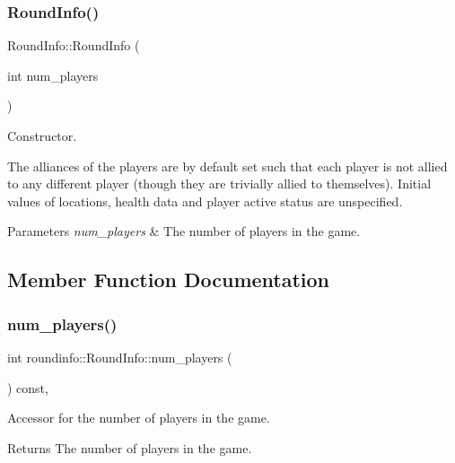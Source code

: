 \subsubsection{\texorpdfstring{Round\+Info()}{RoundInfo()}}
{\footnotesize\ttfamily Round\+Info\+::\+Round\+Info (\begin{DoxyParamCaption}\item[{int}]{num\+\_\+players }\end{DoxyParamCaption})}



Constructor. 

The alliances of the players are by default set such that each player is not allied to any different player (though they are trivially allied to themselves). Initial values of locations, health data and player active status are unspecified. 
\begin{DoxyParams}{Parameters}
{\em num\+\_\+players} & The number of players in the game. \\
\hline
\end{DoxyParams}


\subsection{Member Function Documentation}
\mbox{\label{classroundinfo_1_1_round_info_a004757e903e2b24d73d746040f8afd42}} 
\subsubsection{\texorpdfstring{num\+\_\+players()}{num\_players()}}
{\footnotesize\ttfamily int roundinfo\+::\+Round\+Info\+::num\+\_\+players (\begin{DoxyParamCaption}{ }\end{DoxyParamCaption}) const\hspace{0.3cm}{\ttfamily [inline]}, {\ttfamily [noexcept]}}



Accessor for the number of players in the game. 

\begin{DoxyReturn}{Returns}
The number of players in the game. 
\end{DoxyReturn}
\mbox{\label{classroundinfo_1_1_round_info_aab20da577e7b2741d4e478b6d353324c}} 
